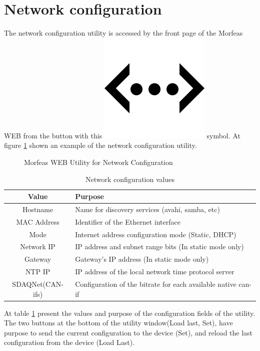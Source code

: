 \newpage
\section{Network configuration}
The network configuration utility is accessed by the front page of the Morfeas WEB from the button with
this \includegraphics[height=.125in]{../art/eth.png} symbol.
At figure \ref{fig:net_conf} shown an example of the network configuration utility.

\begin{figure}[h]
\centering
	\caption{Morfeas WEB Utility for Network Configuration}
	\label{fig:net_conf}
\end{figure}

\begin{table}[h!]
	\begin{center}
		\begin{tabular}{|c|l|}
			\hline
			\textbf{Value} & \textbf{Purpose}\\
			\hline
			Hostname & Name for discovery services (avahi, samba, etc)\\
			\hline
			MAC Address & Identifier of the Ethernet interface\\
			\hline
			Mode & Internet address configuration mode (Static, DHCP)\\
			\hline
			Network IP & IP address and subnet range bits (In static mode only)\\
			Gateway & Gateway's IP address (In static mode only)\\
			\hline
			NTP IP & IP address of the local network time protocol server\\
			\hline
			SDAQNet(CAN-ifs) & Configuration of the bitrate for each available native can-if\\
			\hline
		\end{tabular}
		\caption{Network configuration values}
		\label{tab:net_conf}
	\end{center}
\end{table}

At table \ref{tab:net_conf} present the values and purpose of the configuration fields of the utility.
The two buttons at the bottom of the utility window(Load last, Set),
have purpose to send the current configuration to the device (Set),
and reload the last configuration from the device (Load Last).